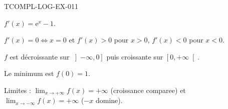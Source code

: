 \begin{corrige}{TCOMPL-LOG-EX-011}

$f'(x) = \mathrm{e}^x - 1$.


$f'(x) = 0 \iff x = 0$ et $f'(x) > 0$ pour $x > 0$, $f'(x) < 0$ pour $x < 0$.

$f$ est décroissante sur $\left]-\infty, 0\right]$ puis croissante sur $\left[0, +\infty\right[$.

Le minimum est $f(0) = 1$.

Limites : $\lim_{x \to +\infty} f(x) = +\infty$ (croissance comparee) et $\lim_{x \to -\infty} f(x) = +\infty$ ($-x$ domine).

\end{corrige}
